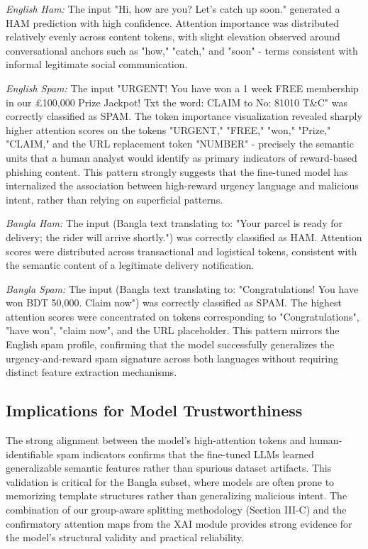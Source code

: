 \documentclass[journal]{IEEEtran}
\begin{document}
\textit{English Ham:} The input "Hi, how are you? Let's catch up soon."
generated a HAM prediction with high confidence. Attention importance
was distributed relatively evenly across content tokens, with slight
elevation observed around conversational anchors such as "how," "catch,"
and "soon" - terms consistent with informal legitimate social
communication.

\textit{English Spam:} The input "URGENT! You have won a 1 week FREE
membership in our \pounds 100,000 Prize Jackpot! Txt the word: CLAIM to No:
81010 T\&C" was correctly classified as SPAM. The token importance
visualization revealed sharply higher attention scores on the tokens
"URGENT," "FREE," "won," "Prize," "CLAIM," and the URL replacement token
"NUMBER" - precisely the semantic units that a human analyst would
identify as primary indicators of reward-based phishing content. This
pattern strongly suggests that the fine-tuned model has internalized the
association between high-reward urgency language and malicious intent,
rather than relying on superficial patterns.

\textit{Bangla Ham:} The input (Bangla text translating to: "Your parcel is ready for delivery; the rider will arrive shortly.") was correctly classified as HAM. Attention scores were distributed across transactional and logistical tokens, consistent with the semantic content of a legitimate delivery notification.

\textit{Bangla Spam:} The input (Bangla text translating to: "Congratulations! You have won BDT 50,000. Claim now") was correctly classified as SPAM. The highest attention scores were concentrated on tokens corresponding to "Congratulations", "have won", "claim now", and the URL placeholder. This pattern mirrors the English spam profile, confirming that the model successfully generalizes the urgency-and-reward spam signature across both languages without requiring distinct feature extraction mechanisms.


\subsection{Implications for Model Trustworthiness}

The strong alignment between the model's high-attention tokens and human-identifiable spam indicators confirms that the fine-tuned LLMs learned generalizable semantic features rather than spurious dataset artifacts. This validation is critical for the Bangla subset, where models are often prone to memorizing template structures rather than generalizing malicious intent. The combination of our group-aware splitting methodology (Section III-C) and the confirmatory attention maps from the XAI module provides strong evidence for the model's structural validity and practical reliability.
\end{document}

